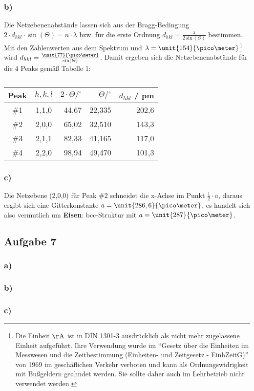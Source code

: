 \documentclass[11pt]{article}
\begin{document}
\subsubsection*{b)}
Die Netzebenenabstände lassen sich aus der Bragg-Bedingung
$2 \cdot d_{hkl} \cdot \sin(\varTheta) = n \cdot \lambda$ bzw. für die erste Ordnung
$d_{hkl} = \frac{\lambda}{2 \sin(\varTheta)}$ bestimmen. Mit den Zahlenwerten aus dem
Spektrum und $\lambda =\unit{154}{\pico \meter}$\footnote{Die Einheit $\mathrm{\AA}$
ist in DIN 1301-3 ausdrücklich als nicht mehr zugelassene Einheit aufgeführt.
Ihre Verwendung wurde im "`Gesetz über die Einheiten im Messwesen und die
Zeitbestimmung (Einheiten- und Zeitgesetz - EinhZeitG)"' von 1969 im
geschäflichen Verkehr verboten und kann als Ordnungswidrigkeit mit
Bußgeldern geahndet werden. Sie sollte daher auch im Lehrbetrieb nicht verwendet werden.}
wird $d_{hkl} = \frac{\unit{77}{\pico \meter}}{\sin(\varTheta)}$.
Damit ergeben sich die Netzebenenabstände für die 4 Peaks gemäß Tabelle 1:
\begin{table}[htbp]
\caption{}
\begin{center}
\begin{tabular}{|c|c|r|r|r|}
\hline
Peak & $h,k,l$ & $ 2 \cdot \varTheta / { }^\circ $ & $ \varTheta / { }^\circ $
  & $d_{hkl}$ / pm \\ \hline \hline
\#1 & 1,1,0 & 44,67 & 22,335 & 202,6 \\ \hline
\#2 & 2,0,0 & 65,02 & 32,510 & 143,3 \\ \hline
\#3 & 2,1,1 & 82,33 & 41,165 & 117,0 \\ \hline
\#4 & 2,2,0 & 98,94 & 49,470 & 101,3 \\ \hline
\end{tabular}
\end{center}
\label{}
\end{table}

\subsubsection*{c)}
Die Netzebene (2,0,0) für Peak \#2 schneidet die x-Achse im Punkt
$\frac{1}{2} \cdot a$, daraus ergibt sich eine Gitterkonstante
$a = \unit{286,6}{\pico \meter}$, es handelt sich also vermutlich um
\textbf{Eisen}: bcc-Struktur mit $a = \unit{287}{\pico \meter}$.

\subsection*{Aufgabe 7}
\subsubsection*{a)}

\subsubsection*{b)}

\subsubsection*{c)}
\end{document}
